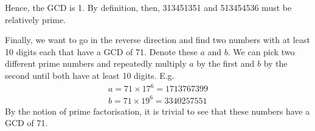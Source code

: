Hence, the GCD is 1. By definition, then, 313451351 and 513454536 must be relatively prime.

Finally, we want to go in the reverse direction and find two numbers with at least 10 digits each that have a GCD of 71. Denote these $a$ and $b$. We can pick two different prime numbers and repeatedly multiply $a$ by the first and $b$ by the second until both have at least 10 digits. E.g.
\begin{align*}
    a = 71 \times 17^{6} = 1713767399 \\
    b = 71 \times 19^{6} = 3340257551
\end{align*}
By the notion of prime factorisation, it is trivial to see that these numbers have a GCD of 71.

